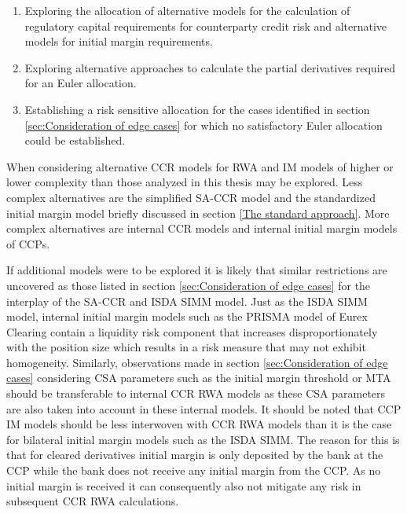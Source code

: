 \documentclass[../Thesis_AHoecherl.tex]{subfiles}
\begin{document}
\begin{enumerate}
    \item Exploring the allocation of alternative models for the calculation of regulatory capital requirements for counterparty credit risk and alternative models for initial margin requirements.
    \item Exploring alternative approaches to calculate the partial derivatives required for an Euler allocation.
    \item Establishing a risk sensitive allocation for the cases  identified in section \ref{sec:Consideration of edge cases} for which no satisfactory Euler allocation could be established.
\end{enumerate}

When considering alternative CCR models for RWA and IM models of higher or lower complexity than those analyzed in this thesis may be explored. 
Less complex alternatives are the simplified \gls{SA-CCR} model \cite[Article 281 and following]{CRRII} and the standardized initial margin model briefly discussed in section \ref{The standard approach}. 
More complex alternatives are internal CCR models \cite[CRE 53]{CRE} and internal initial margin models of \glspl{CCP}.

If additional models were to be explored it is likely that similar restrictions are uncovered as those listed in section \ref{sec:Consideration of edge cases} for the interplay of the \gls{SA-CCR} and \gls{ISDA SIMM} model.
Just as the \gls{ISDA SIMM} model, internal initial margin models such as the PRISMA model of Eurex Clearing contain a liquidity risk component that increases disproportionately with the position size \cite[Section 3.5]{EurexDec2012} which results in a risk measure that may not exhibit homogeneity.
Similarly, observations made in section \ref{sec:Consideration of edge cases} considering \gls{CSA} parameters such as the initial margin threshold or MTA should be transferable to internal CCR RWA models as these CSA parameters are also taken into account in these internal models.
It should be noted that CCP IM models should be less interwoven with CCR RWA models than it is the case for bilateral initial margin models such as the \gls{ISDA SIMM}. 
The reason for this is that for cleared derivatives initial margin is only deposited by the bank at the \gls{CCP} while the bank does not receive any initial margin from the \gls{CCP}.
As no initial margin is received it can consequently also not mitigate any risk in subsequent CCR RWA calculations.
\end{document}
